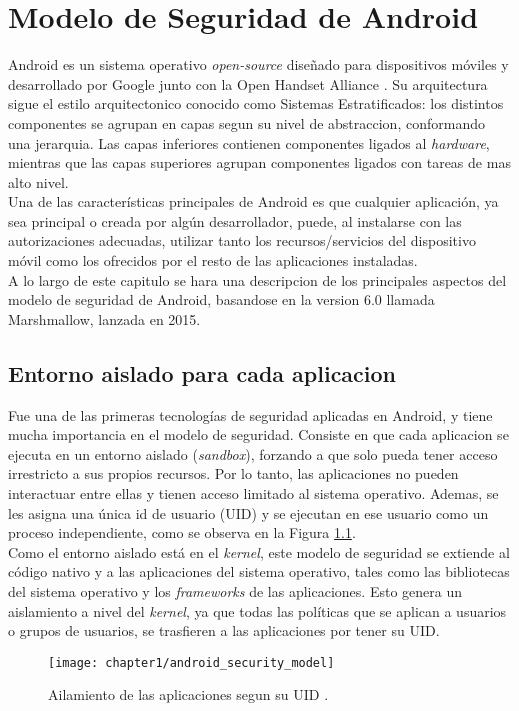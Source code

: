 \chapter{Modelo de Seguridad de Android}
Android \cite{aos} es un sistema operativo \textit{open-source} \cite{aosp} diseñado para dispositivos móviles y
desarrollado por Google junto con la Open Handset Alliance \cite{oha}. Su arquitectura sigue el estilo arquitectonico conocido como Sistemas Estratificados: los distintos componentes se agrupan en capas segun su nivel de abstraccion, conformando una jerarquia. Las capas inferiores contienen componentes ligados al \textit{hardware}, mientras que las capas superiores agrupan componentes ligados con tareas de mas alto nivel.\\
Una de las características principales de Android es que cualquier aplicación, ya sea principal o
creada por algún desarrollador, puede, al instalarse con las autorizaciones adecuadas, utilizar tanto
los recursos/servicios del dispositivo móvil como los ofrecidos por el resto de las aplicaciones
instaladas.\\
A lo largo de este capitulo se hara una descripcion de los principales aspectos del modelo de seguridad de Android, basandose en la version 6.0 llamada Marshmallow, lanzada en 2015.
\section{Entorno aislado para cada aplicacion}\label{ch01-sandbox}
Fue una de las primeras tecnologías de seguridad aplicadas en Android, y tiene mucha importancia en el modelo de seguridad. Consiste en que cada aplicacion se ejecuta en un entorno aislado (\textit{sandbox}), forzando a que solo pueda tener acceso irrestricto a sus propios recursos. Por lo tanto, las aplicaciones no pueden interactuar entre ellas y tienen acceso limitado al sistema operativo. Ademas, se les asigna una única id de usuario (UID) y se ejecutan en ese usuario como un proceso independiente, como se observa en la Figura \ref{fig:ch01:sandbox}.\\
Como el entorno aislado está en el \textit{kernel}, este modelo de seguridad se extiende al código nativo y a las aplicaciones del sistema operativo, tales como las bibliotecas del sistema operativo y los \textit{frameworks} de las aplicaciones. Esto genera un aislamiento a nivel del \textit{kernel}, ya que todas las políticas que se aplican a usuarios o grupos de usuarios, se trasfieren a las aplicaciones por tener su UID.
\begin{figure}[!hb]
	\begin{center}
		\texttt{[image: chapter1/android\_security\_model]}
	    \caption{Ailamiento de las aplicaciones segun su UID \cite{asreview2015}.}
	    \label{fig:ch01:sandbox}
    \end{center}
\end{figure}
